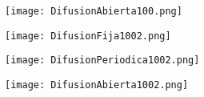 \documentclass[12pts]{article}
\begin{document}
\begin{figure}[h]
\begin{center}
\texttt{[image: DifusionAbierta100.png]}
\end{center}

\end{figure}

\begin{figure}[h]
\begin{center}
\texttt{[image: DifusionFija1002.png]}
\end{center}

\end{figure}

\begin{figure}[h]
\begin{center}
\texttt{[image: DifusionPeriodica1002.png]}
\end{center}

\end{figure}

\begin{figure}[h]
\begin{center}
\texttt{[image: DifusionAbierta1002.png]}
\end{center}

\end{figure}
\end{document}
